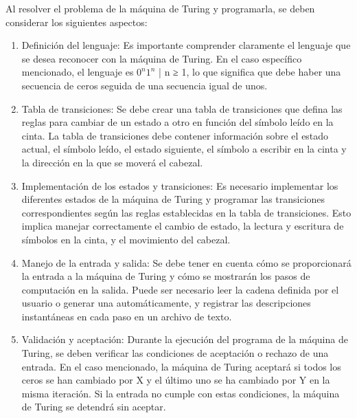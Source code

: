 Al resolver el problema de la máquina de Turing y programarla, se deben considerar los siguientes aspectos:\newline
\begin{enumerate}
    \item Definición del lenguaje: Es importante comprender claramente el lenguaje que se desea reconocer con la máquina de Turing. En el caso específico mencionado, el lenguaje es {$0^n$$1^n$ | n ≥ 1}, lo que significa que debe haber una secuencia de ceros seguida de una secuencia igual de unos.\newline

    \item Tabla de transiciones: Se debe crear una tabla de transiciones que defina las reglas para cambiar de un estado a otro en función del símbolo leído en la cinta. La tabla de transiciones debe contener información sobre el estado actual, el símbolo leído, el estado siguiente, el símbolo a escribir en la cinta y la dirección en la que se moverá el cabezal.\newline
    
    \item Implementación de los estados y transiciones: Es necesario implementar los diferentes estados de la máquina de Turing y programar las transiciones correspondientes según las reglas establecidas en la tabla de transiciones. Esto implica manejar correctamente el cambio de estado, la lectura y escritura de símbolos en la cinta, y el movimiento del cabezal.\newline
    
    \item Manejo de la entrada y salida: Se debe tener en cuenta cómo se proporcionará la entrada a la máquina de Turing y cómo se mostrarán los pasos de computación en la salida. Puede ser necesario leer la cadena definida por el usuario o generar una automáticamente, y registrar las descripciones instantáneas en cada paso en un archivo de texto.\newline
    
    \item Validación y aceptación: Durante la ejecución del programa de la máquina de Turing, se deben verificar las condiciones de aceptación o rechazo de una entrada. En el caso mencionado, la máquina de Turing aceptará si todos los ceros se han cambiado por X y el último uno se ha cambiado por Y en la misma iteración. Si la entrada no cumple con estas condiciones, la máquina de Turing se detendrá sin aceptar.\newline
\end{enumerate}


